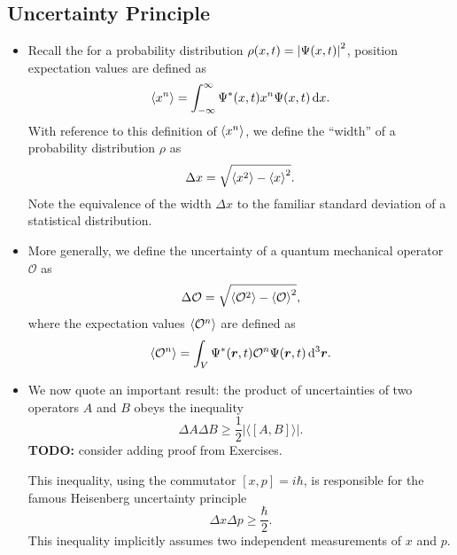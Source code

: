 \documentclass[11pt, a4paper]{article}
\newcommand{\diff}{\mathop{}\!\mathrm{d}} %
\newcommand{\dr}{\diff^{3} \r}  %
\renewcommand{\vec}[1]{\bm{#1}} %
\renewcommand{\r}{\vec{r}}  %
\renewcommand{\O}{\mathcal{O}}  %
\renewcommand{\P}{\Psi}  %
\newcommand{\evb}[1]{\big \langle {#1} \big \rangle}  %
\begin{document}
\subsection{Uncertainty Principle}
\begin{itemize}
	\item Recall the for a probability distribution $ \rho(x, t) = \abs{\P(x, t)}^{2} $, position expectation values are defined as
	\begin{equation*}
		\ev{x^{n}} = \int_{-\infty}^{\infty} \P^{*}(x, t) x^{n} \P(x, t) \diff x.
	\end{equation*}
	With reference to this definition of $ \ev{x^{n}} $, we define the ``width'' of a probability distribution $ \rho $ as
	\begin{equation*}
		\Delta x = \sqrt{\ev{x^{2}} - \ev{x}^{2}}.
	\end{equation*}
	Note the equivalence of the width $ \Delta x $ to the familiar standard deviation of a statistical distribution. 
	
	\item More generally, we define the uncertainty of a quantum mechanical operator $ \O $ as
	\begin{equation*}
		\Delta \O = \sqrt{\ev{\O^{2}} - \ev{\O}^{2}},
	\end{equation*}
	where the expectation values $ \ev{\O^{n}} $ are defined as
	\begin{equation*}
		\ev{\O^{n}} = \int_{V} \P^{*}(\r, t) \O^{n} \P(\r, t) \dr.
	\end{equation*}
	
	\item We now quote an important result: the product of uncertainties of two operators $ A $ and $ B $ obeys the inequality
	\begin{equation*}
		\Delta A \Delta B \geq \frac{1}{2} \big | \evb{[A, B]} \big |.
	\end{equation*} 
	\textbf{TODO:} consider adding proof from Exercises.
	
	This inequality, using the commutator $ [x, p] = i \hbar $, is responsible for the famous Heisenberg uncertainty principle
	\begin{equation*}
		\Delta x \Delta p \geq \frac{\hbar}{2}.
	\end{equation*}
	This inequality implicitly assumes two independent measurements of $ x $ and $ p $.
	
\end{itemize}
\end{document}

